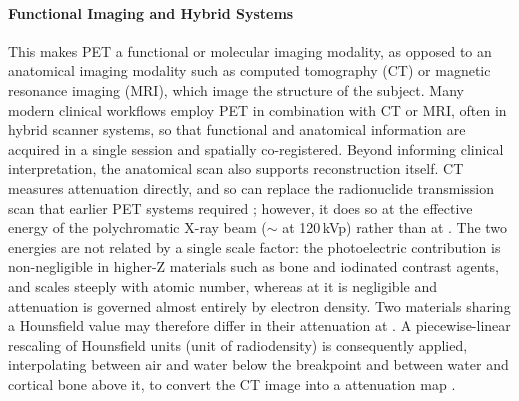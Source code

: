 \paragraph{Functional Imaging and Hybrid Systems}
This makes PET a functional or molecular imaging modality, as opposed to an anatomical imaging modality such as computed tomography (CT) or magnetic resonance imaging (MRI), which image the structure of the subject.
Many modern clinical workflows employ PET in combination with CT or MRI, often in hybrid scanner systems, so that functional and anatomical information are acquired in a single session and spatially co-registered.
Beyond informing clinical interpretation, the anatomical scan also supports reconstruction itself.
CT measures attenuation directly, and so can replace the radionuclide transmission scan that earlier PET systems required \cite{Kinahan1998}; however,  it does so at the effective energy of the polychromatic X-ray beam ($\sim$ at 120\,kVp) rather than at .
The two energies are not related by a single scale factor: the photoelectric contribution is non-negligible in higher-Z materials such as bone and iodinated contrast agents, and scales steeply with atomic number, whereas at  it is negligible and attenuation is governed almost entirely by electron density.
Two materials sharing a Hounsfield value may therefore differ in their attenuation at .
A piecewise-linear rescaling of Hounsfield units (unit of radiodensity) is consequently applied, interpolating between air and water below the breakpoint and between water and cortical bone above it, to convert the CT image into a  attenuation map \cite{Burger2003,Carney2006}.

